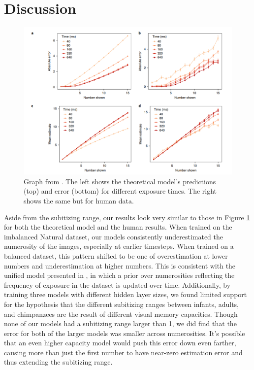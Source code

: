 \documentclass{article}
\begin{document}
\section{Discussion}
\begin{figure}[H]
    \centering
    \includegraphics[width=0.8\linewidth]{template/unified.png}
    \caption{Graph from \cite{unified}. The left shows the theoretical model's predictions (top) and error (bottom) for different exposure times. The right shows the same but for human data.}
    \label{fig:unified_graph}
\end{figure}
Aside from the subitizing range, our results look very similar to those in Figure \ref{fig:unified_graph} for both the theoretical model and the human results. When trained on the imbalanced Natural dataset, our models consistently underestimated the numerosity of the images, especially at earlier timesteps. When trained on a balanced dataset, this pattern shifted to be one of overestimation at lower numbers and underestimation at higher numbers. This is consistent with the unified model presented in \cite{unified}, in which a prior over numerosities reflecting the frequency of exposure in the dataset is updated over time. \newline
Additionally, by training three models with different hidden layer sizes, we found limited support for the hypothesis that the different subitizing ranges between infants, adults, and chimpanzees are the result of different visual memory capacities. Though none of our models had a subitizing range larger than 1, we did find that the error for both of the larger models was smaller across numerosities. It's possible that an even higher capacity model would push this error down even farther, causing more than just the first number to have near-zero estimation error and thus extending the subitizing range. \newline
\end{document}
